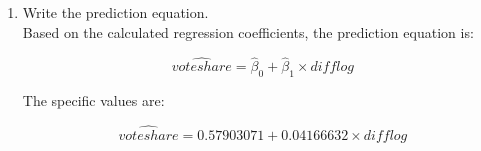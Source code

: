 \documentclass[12pt,letterpaper]{article}
\begin{document}
\begin{enumerate}
		 
		\vspace{5cm}
		
		\item Write the prediction equation.\\
		
		\vspace{.5cm}
		Based on the calculated regression coefficients, the prediction equation is:
		
		$$
		\hat{voteshare} = \hat{\beta}_0 + \hat{\beta}_1 \times difflog
		$$
		
		The specific values are:
		
		$$
		\hat{voteshare} = 0.57903071 + 0.04166632 \times difflog
		$$
		
	\end{enumerate}
	
\newpage
\end{document}
